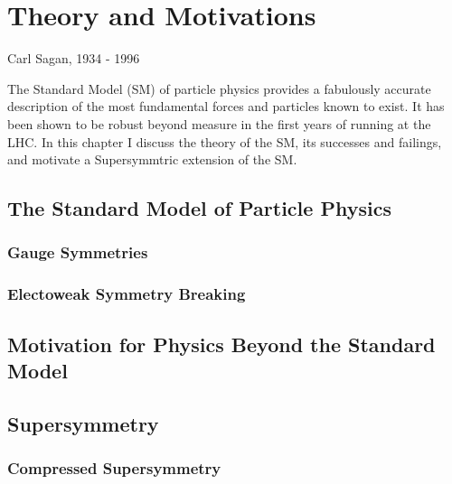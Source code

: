 \chapter{Theory and Motivations}
\label{chap:theory}



{Carl Sagan, 1934 - 1996}%

The Standard Model (SM) of particle physics provides a fabulously accurate description of the most fundamental forces and particles known to exist.
It has been shown to be robust beyond measure in the first years of running at the LHC.
In this chapter I discuss the theory of the SM, its successes and failings, and motivate a Supersymmtric extension of the SM.

\section{The Standard Model of Particle Physics \label{th:sm}}

\subsection{Gauge Symmetries \label{th:gauge}}

\subsection{Electoweak Symmetry Breaking \label{th:EW}}

\section{Motivation for Physics Beyond the Standard Model \label{th:BSM}}

\section{Supersymmetry \label{th:SUSY}}

\subsection{Compressed Supersymmetry \label{th:CMPsusy}}

